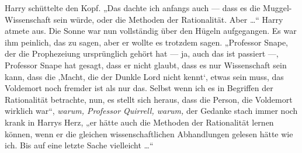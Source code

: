 Harry schüttelte den Kopf.
„Das dachte ich anfangs auch — dass es die Muggel-Wissenschaft sein würde, oder die Methoden der Rationalität. Aber …“
Harry atmete aus. Die Sonne war nun vollständig über den Hügeln aufgegangen. Es war ihm peinlich, das zu sagen, aber er wollte es trotzdem sagen.
„Professor Snape, der die Prophezeiung ursprünglich gehört hat — ja, auch das ist passiert —, Professor Snape hat gesagt, dass er nicht glaubt, dass es nur Wissenschaft sein kann, dass die ‚Macht, die der Dunkle Lord nicht kennt‘, etwas sein muss, das Voldemort noch fremder ist als nur das. Selbst wenn ich es in Begriffen der Rationalität betrachte, nun, es stellt sich heraus, dass die Person, die Voldemort wirklich war“,
\emph{warum, Professor Quirrell, warum,} der Gedanke stach immer noch krank in Harrys Herz,
„er hätte auch die Methoden der Rationalität lernen können, wenn er die gleichen wissenschaftlichen Abhandlungen gelesen hätte wie ich. Bis auf eine letzte Sache vielleicht …“
